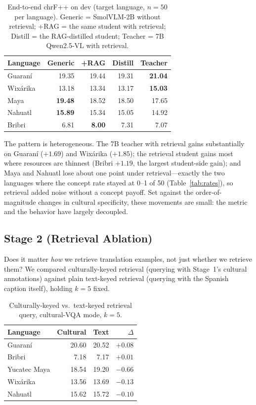 \documentclass[11pt]{article}
\begin{document}
\begin{table}[t]
\centering
\small
\begin{tabular}{lrrrr}
\toprule
Language & Generic & +RAG & Distill & Teacher \\
\midrule
Guaraní   & 19.35 & 19.44 & 19.31 & \textbf{21.04} \\
Wixárika  & 13.18 & 13.34 & 13.17 & \textbf{15.03} \\
Maya      & \textbf{19.48} & 18.52 & 18.50 & 17.65 \\
Nahuatl   & \textbf{15.89} & 15.34 & 15.05 & 14.92 \\
Bribri    & 6.81  & \textbf{8.00} & 7.31 & 7.07 \\
\bottomrule
\end{tabular}
\caption{End-to-end chrF++ on dev (target language, $n{=}50$ per language).
Generic = SmolVLM-2B without retrieval; +RAG = the same student with
retrieval; Distill = the RAG-distilled student; Teacher = 7B Qwen2.5-VL with
retrieval.}
\label{tab:endtoend}
\end{table}

The pattern is heterogeneous. The 7B teacher with retrieval gains
substantially on Guaraní ($+1.69$) and Wixárika ($+1.85$); the retrieval
student gains most where resources are thinnest (Bribri $+1.19$, the largest
student-side gain); and Maya and Nahuatl lose about one point under
retrieval---exactly the two languages where the concept rate stayed at
0--1 of 50 (Table~\ref{tab:rates}), so retrieval added noise without a
concept payoff. Set against the order-of-magnitude changes in cultural
specificity, these movements are small: the metric and the behavior have
largely decoupled.

\subsection{Stage 2 (Retrieval Ablation)}
Does it matter \emph{how} we retrieve translation examples, not just
whether we retrieve them? We compared culturally-keyed retrieval (querying
with Stage~1's cultural annotations) against plain text-keyed retrieval
(querying with the Spanish caption itself), holding $k{=}5$ fixed.

\begin{table}[h]
\centering
\small
\begin{tabular}{lrrr}
\toprule
Language & Cultural & Text & $\Delta$ \\
\midrule
Guaraní      & 20.60 & 20.52 & $+0.08$ \\
Bribri       & 7.18  & 7.17  & $+0.01$ \\
Yucatec Maya & 18.54 & 19.20 & $-0.66$ \\
Wixárika     & 13.56 & 13.69 & $-0.13$ \\
Nahuatl      & 15.62 & 15.72 & $-0.10$ \\
\bottomrule
\end{tabular}
\caption{Culturally-keyed vs.\ text-keyed retrieval query, cultural-VQA
mode, $k{=}5$.}
\label{tab:queryarm}
\end{table}
\end{document}
